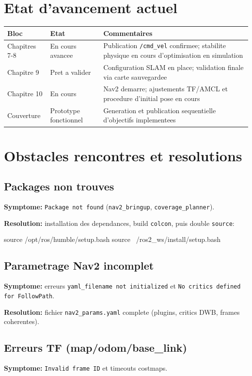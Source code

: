 \documentclass[11pt,a4paper,french]{imta}
\begin{document}
\section{Etat d'avancement actuel}
\begin{center}
\begin{tabular}{p{3.6cm}p{2.8cm}p{7.2cm}}
\toprule
\textbf{Bloc} & \textbf{Etat} & \textbf{Commentaires} \\
\midrule
Chapitres 7-8 & En cours avancee & Publication \texttt{/cmd\_vel} confirmee; stabilite physique en cours d'optimisation en simulation \\
Chapitre 9 & Pret a valider & Configuration SLAM en place; validation finale via carte sauvegardee \\
Chapitre 10 & En cours & Nav2 demarre; ajustements TF/AMCL et procedure d'initial pose en cours \\
Couverture & Prototype fonctionnel & Generation et publication sequentielle d'objectifs implementees \\
\bottomrule
\end{tabular}
\end{center}

\section{Obstacles rencontres et resolutions}
\subsection{Packages non trouves}
\textbf{Symptome:} \texttt{Package not found} (\texttt{nav2\_bringup}, \texttt{coverage\_planner}).

\textbf{Resolution:} installation des dependances, build \texttt{colcon}, puis double \texttt{source}:
\begin{bash}
source /opt/ros/humble/setup.bash
source ~/ros2_ws/install/setup.bash
\end{bash}

\subsection{Parametrage Nav2 incomplet}
\textbf{Symptome:} erreurs \texttt{yaml\_filename not initialized} et \texttt{No critics defined for FollowPath}.

\textbf{Resolution:} fichier \texttt{nav2\_params.yaml} complete (plugins, critics DWB, frames coherentes).

\subsection{Erreurs TF (map/odom/base\_link)}
\textbf{Symptome:} \texttt{Invalid frame ID} et timeouts costmaps.
\end{document}
